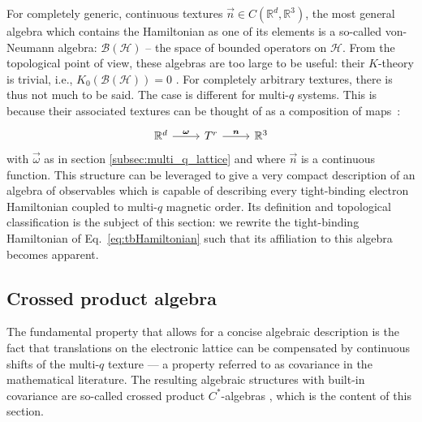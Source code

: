 \documentclass[submission, Phys]{SciPost}
\begin{document}
For completely generic, continuous textures $\vec{n} \in C( \mathbb{R}^d, \mathbb{R}^3)$, the most general algebra which contains the Hamiltonian as one of its elements is a so-called von-Neumann algebra: $\mathcal{B}(\mathcal{H})$ -- the space of bounded operators on $\mathcal{H}$.
From the topological point of view, these algebras are too large to be useful: their $K$-theory is trivial, i.e., $K_0(\mathcal{B}(\mathcal{H})) = 0$ \cite[p. 47]{Rordam2000}. 
For completely arbitrary textures, there is thus not much to be said.
The case is different for multi-$q$ systems. This is because their associated textures can be thought of as a composition of maps~\cite{Lux2024}:
\begin{equation}
    \begin{tikzcd}
	{\mathbb{R}^d} & {T^r} & {\mathbb{R}^3}
	\arrow["{\vec{\omega}}", from=1-1, to=1-2]
	\arrow["{\vec{n}}", from=1-2, to=1-3]
\end{tikzcd}
\end{equation}
with $\vec{\omega}$ as in section \ref{subsec:multi_q_lattice} and where $\vec{n}$ is a continuous function. 
This structure can be leveraged to give a very compact description of an algebra of observables which is capable of describing every tight-binding electron Hamiltonian coupled to multi-$q$ magnetic order. 
Its definition and topological classification is the subject of this section: we rewrite the tight-binding Hamiltonian of Eq.~\eqref{eq:tbHamiltonian} such that its affiliation to this algebra becomes apparent.

\subsection{Crossed product algebra}
\label{subsec:crossed_product_algebra}

The fundamental property that allows for a concise algebraic description is the fact that translations on the electronic lattice can be compensated by continuous shifts of the multi-$q$ texture ---  a property referred to as covariance in the mathematical literature. The resulting algebraic structures with built-in covariance are so-called crossed product $C^\ast$-algebras \cite[Ch.~7]{Pedersen2018}, which is the content of this section.
\end{document}
